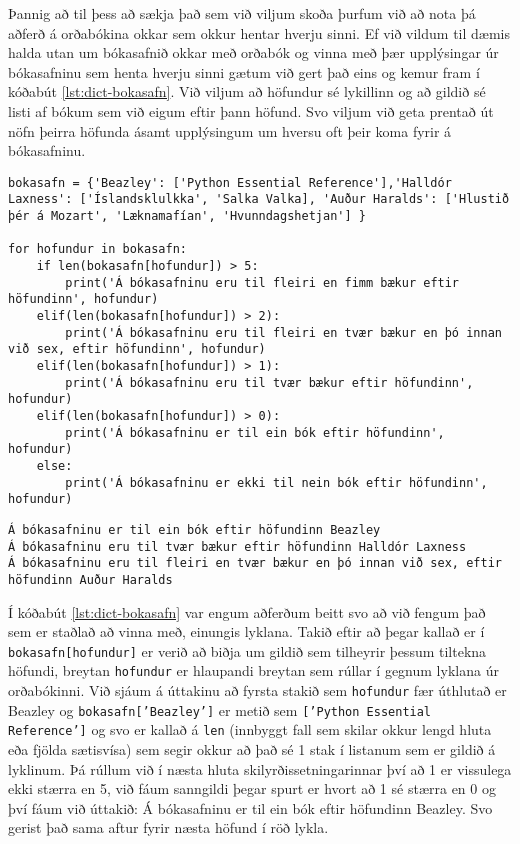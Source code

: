 Þannig að til þess að sækja það sem við viljum skoða þurfum við að nota þá aðferð á orðabókina okkar sem okkur hentar hverju sinni.
Ef við vildum til dæmis halda utan um bókasafnið okkar með orðabók og vinna með þær upplýsingar úr bókasafninu sem henta hverju sinni gætum við gert það eins og kemur fram í kóðabút \ref{lst:dict-bokasafn}.
Við viljum að höfundur sé lykillinn og að gildið sé listi af bókum sem við eigum eftir þann höfund.
Svo viljum við geta prentað út nöfn þeirra höfunda ásamt upplýsingum um hversu oft þeir koma fyrir á bókasafninu.

\begin{lstlisting}[caption=Skoðum hvernig megi ítra í gegnum orðabækur, label=lst:dict-bokasafn]
bokasafn = {'Beazley': ['Python Essential Reference'],'Halldór Laxness': ['Íslandsklulkka', 'Salka Valka], 'Auður Haralds': ['Hlustið þér á Mozart', 'Læknamafían', 'Hvunndagshetjan'] }

for hofundur in bokasafn:
	if len(bokasafn[hofundur]) > 5:
		print('Á bókasafninu eru til fleiri en fimm bækur eftir höfundinn', hofundur)
	elif(len(bokasafn[hofundur]) > 2):
		print('Á bókasafninu eru til fleiri en tvær bækur en þó innan við sex, eftir höfundinn', hofundur)
	elif(len(bokasafn[hofundur]) > 1):
		print('Á bókasafninu eru til tvær bækur eftir höfundinn', hofundur)
	elif(len(bokasafn[hofundur]) > 0):
		print('Á bókasafninu er til ein bók eftir höfundinn', hofundur)
	else:
		print('Á bókasafninu er ekki til nein bók eftir höfundinn', hofundur)
\end{lstlisting}
\lstset{style=uttak}
\begin{lstlisting}
Á bókasafninu er til ein bók eftir höfundinn Beazley
Á bókasafninu eru til tvær bækur eftir höfundinn Halldór Laxness
Á bókasafninu eru til fleiri en tvær bækur en þó innan við sex, eftir höfundinn Auður Haralds
\end{lstlisting}
\lstset{style=venjulegt}

Í kóðabút \ref{lst:dict-bokasafn} var engum aðferðum beitt svo að við fengum það sem er staðlað að vinna með, einungis lyklana.
Takið eftir að þegar kallað er í \texttt{bokasafn[hofundur]} er verið að biðja um gildið sem tilheyrir þessum tiltekna höfundi, breytan \texttt{hofundur} er hlaupandi breytan sem rúllar í gegnum lyklana úr orðabókinni.
Við sjáum á úttakinu að fyrsta stakið sem \texttt{hofundur} fær úthlutað er Beazley og \texttt{bokasafn['Beazley']} er metið sem \texttt{['Python Essential Reference']} og svo er kallað á \texttt{len} (innbyggt fall sem skilar okkur lengd hluta eða fjölda sætisvísa) sem segir okkur að það sé 1 stak í listanum sem er gildið á lyklinum.
Þá rúllum við í næsta hluta skilyrðissetningarinnar því að 1 er vissulega ekki stærra en 5, við fáum sanngildi þegar spurt er hvort að 1 sé stærra en 0 og því fáum við úttakið: Á bókasafninu er til ein bók eftir höfundinn Beazley.
Svo gerist það sama aftur fyrir næsta höfund í röð lykla.

